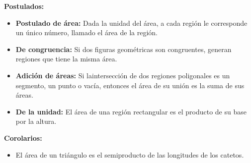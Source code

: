 \documentclass[•]{article}
\begin{document}
\begin{flushleft}
		
		\textbf{Postulados: }
		\begin{itemize}
			\item \textbf{Postulado de \'area:} Dada la unidad del \'area, a cada regi\'on le corresponde un \'unico n\'umero, llamado el \'area de la regi\'on.
			\item \textbf{De congruencia: }Si dos figuras geom\'etricas son congruentes, generan regiones que tiene la misma \'area.
			\item \textbf{Adici\'on de \'areas: }Si laintersecci\'on de dos regiones poligonales es un segmento, un punto o vac\'ia, entonces el \'area de su uni\'on es la suma de sus \'areas.
			\item \textbf{De la unidad: }El \'area de una regi\'on rectangular es el producto de su base por la altura.
		\end{itemize}
		
		
		
		\textbf{Corolarios: }
		\begin{itemize}
			\item El \'area de un tri\'angulo es el semiproducto de las longitudes de los catetos. 
		\end{itemize}
	\end{flushleft}
\end{document}
